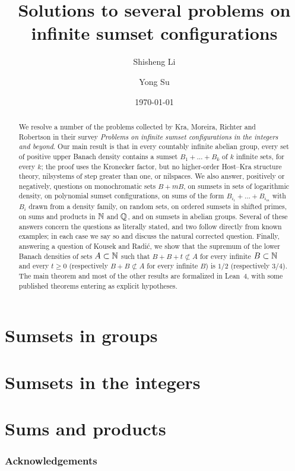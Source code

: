 \documentclass[11pt]{amsart}
\title[Solutions to problems on infinite sumset configurations]{Solutions to several problems on\\ infinite sumset configurations}
\author{Shisheng Li}
\author{Yong Su}
\date{\today}
\theoremstyle{plain}
\theoremstyle{definition}
\theoremstyle{remark}
\begin{document}
\begin{abstract}
We resolve a number of the problems collected by Kra, Moreira, Richter and Robertson in their survey
\emph{Problems on infinite sumset configurations in the integers and beyond}.
Our main result is that in every countably infinite abelian group, every set of positive upper Banach
density contains a sumset $B_1+\dots+B_k$ of $k$ infinite sets, for every $k$; the proof uses the
Kronecker factor, but no higher-order Host--Kra structure theory, nilsystems of step greater than one,
or nilspaces.
We also answer, positively or negatively, questions on monochromatic sets $B+mB$, on sumsets in
sets of logarithmic density, on polynomial sumset configurations, on sums of the form
$B_{i_1}+\dots+B_{i_m}$ with $B_i$ drawn from a density family, on random sets, on ordered sumsets in
shifted primes, on sums and products in $\mathbb{N}$ and $\mathbb{Q}$, and on sumsets in abelian groups. Several of
these answers concern the questions as literally stated, and two follow directly from known
examples; in each case we say so and discuss the natural corrected question.
Finally, answering a question of Kousek and Radi\'c, we show that the supremum of the lower Banach
densities of sets $A\subset\mathbb{N}$ such that $B+B+t\not\subset A$ for every infinite $B\subset\mathbb{N}$ and
every $t\ge0$ (respectively $B+B\not\subset A$ for every infinite $B$) is $1/2$ (respectively $3/4$).
The main theorem and most of the other results are formalized in Lean~4, with some published
theorems entering as explicit hypotheses.
\end{abstract}

\maketitle
\setcounter{tocdepth}{1}
\tableofcontents



\part{Sumsets in groups}



\part{Sumsets in the integers}





\part{Sums and products}


\section*{Acknowledgements}




\end{document}

